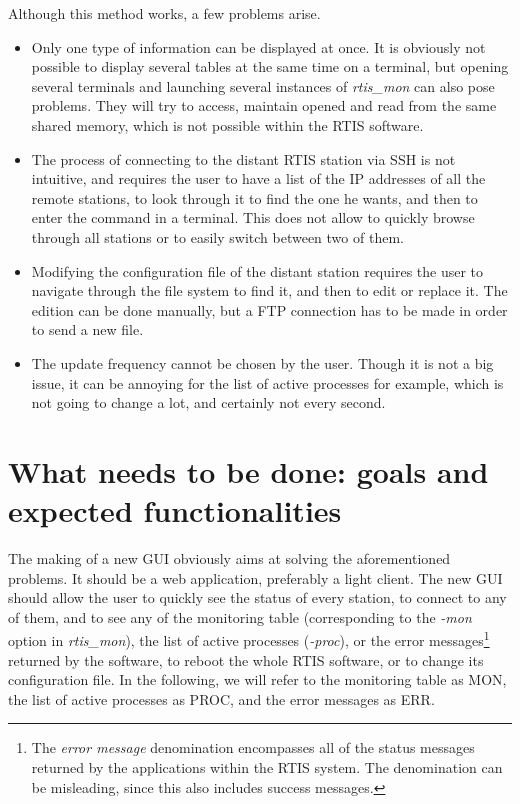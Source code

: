 \documentclass{themeensg}
\begin{document}
Although this method works, a few problems arise.
\begin{itemize}
	\item Only one type of information can be displayed at once. It is obviously not possible to display several tables at the same time on a terminal, but opening several terminals and launching several instances of \textit{rtis\_mon} can also pose problems. They will try to access, maintain opened and read from the same shared memory, which is not possible within the RTIS software. \\
	\item The process of connecting to the distant RTIS station via SSH is not intuitive, and requires the user to have a list of the IP addresses of all the remote stations, to look through it to find the one he wants, and then to enter the command in a terminal. This does not allow to quickly browse through all stations or to easily switch between two of them.
	\item Modifying the configuration file of the distant station requires the user to navigate through the file system to find it, and then to edit or replace it. The edition can be done manually, but a FTP connection has to be made in order to send a new file.
	\item The update frequency cannot be chosen by the user. Though it is not a big issue, it can be annoying for the list of active processes for example, which is not going to change a lot, and certainly not every second.
\end{itemize}



\section{What needs to be done: goals and expected functionalities}

The making of a new GUI obviously aims at solving the aforementioned problems. It should be a web application, preferably a light client. The new GUI should allow the user to quickly see the status of every station, to connect to any of them, and to see any of the monitoring table (corresponding to the \textit{-mon} option in \textit{rtis\_mon}), the list of active processes (\textit{-proc}), or the error messages\footnote{The \textit{error message} denomination encompasses all of the status messages returned by the applications within the RTIS system. The denomination can be misleading, since this also includes success messages.} returned by the software, to reboot the whole RTIS software, or to change its configuration file. In the following, we will refer to the monitoring table as MON, the list of active processes as PROC, and the error messages as ERR.
\end{document}
